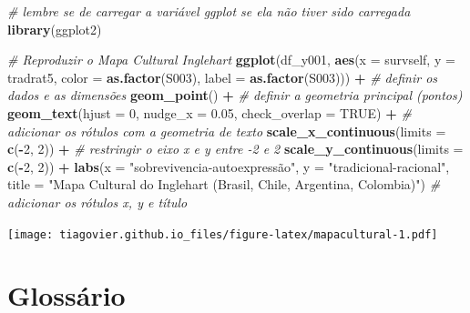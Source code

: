 \documentclass[
  brazil,
]{book}
\newenvironment{Shaded}{\begin{snugshade}}{\end{snugshade}}
\newcommand{\CommentTok}[1]{\textcolor[rgb]{0.56,0.35,0.01}{\textit{#1}}}
\newcommand{\DataTypeTok}[1]{\textcolor[rgb]{0.13,0.29,0.53}{#1}}
\newcommand{\DecValTok}[1]{\textcolor[rgb]{0.00,0.00,0.81}{#1}}
\newcommand{\FloatTok}[1]{\textcolor[rgb]{0.00,0.00,0.81}{#1}}
\newcommand{\KeywordTok}[1]{\textcolor[rgb]{0.13,0.29,0.53}{\textbf{#1}}}
\newcommand{\NormalTok}[1]{#1}
\newcommand{\OperatorTok}[1]{\textcolor[rgb]{0.81,0.36,0.00}{\textbf{#1}}}
\newcommand{\OtherTok}[1]{\textcolor[rgb]{0.56,0.35,0.01}{#1}}
\newcommand{\StringTok}[1]{\textcolor[rgb]{0.31,0.60,0.02}{#1}}
\begin{document}
\begin{Shaded}
\begin{Highlighting}[]
\CommentTok{# lembre se de carregar a variável ggplot se ela não tiver sido carregada }
\KeywordTok{library}\NormalTok{(ggplot2)}

\CommentTok{# Reproduzir o Mapa Cultural Inglehart }
\KeywordTok{ggplot}\NormalTok{(df_y001, }\KeywordTok{aes}\NormalTok{(}\DataTypeTok{x =}\NormalTok{ survself, }
                    \DataTypeTok{y =}\NormalTok{ tradrat5, }
                    \DataTypeTok{color =} \KeywordTok{as.factor}\NormalTok{(S003), }
                    \DataTypeTok{label =} \KeywordTok{as.factor}\NormalTok{(S003))) }\OperatorTok{+}\StringTok{ }\CommentTok{# definir os dados e as dimensões}
\StringTok{  }\KeywordTok{geom_point}\NormalTok{() }\OperatorTok{+}\StringTok{ }\CommentTok{# definir a geometria principal (pontos)}
\StringTok{  }\KeywordTok{geom_text}\NormalTok{(}\DataTypeTok{hjust =} \DecValTok{0}\NormalTok{, }\DataTypeTok{nudge_x =} \FloatTok{0.05}\NormalTok{, }\DataTypeTok{check_overlap =} \OtherTok{TRUE}\NormalTok{) }\OperatorTok{+}\StringTok{ }\CommentTok{# adicionar os rótulos com a geometria de texto}
\StringTok{  }\KeywordTok{scale_x_continuous}\NormalTok{(}\DataTypeTok{limits =} \KeywordTok{c}\NormalTok{(}\OperatorTok{-}\DecValTok{2}\NormalTok{, }\DecValTok{2}\NormalTok{)) }\OperatorTok{+}\StringTok{ }\CommentTok{# restringir o eixo x e y entre -2 e 2}
\StringTok{  }\KeywordTok{scale_y_continuous}\NormalTok{(}\DataTypeTok{limits =} \KeywordTok{c}\NormalTok{(}\OperatorTok{-}\DecValTok{2}\NormalTok{, }\DecValTok{2}\NormalTok{)) }\OperatorTok{+}
\StringTok{  }\KeywordTok{labs}\NormalTok{(}\DataTypeTok{x =} \StringTok{"sobrevivencia-autoexpressão"}\NormalTok{,}
       \DataTypeTok{y =} \StringTok{"tradicional-racional"}\NormalTok{,}
       \DataTypeTok{title =} \StringTok{"Mapa Cultural do Inglehart (Brasil, Chile, Argentina, Colombia)"}\NormalTok{) }\CommentTok{# adicionar os rótulos x, y e título}
\end{Highlighting}
\end{Shaded}

\texttt{[image: tiagovier.github.io\_files/figure-latex/mapacultural-1.pdf]}

\hypertarget{glossuxe1rio}{%
\chapter{Glossário}\label{glossuxe1rio}}
\end{document}
